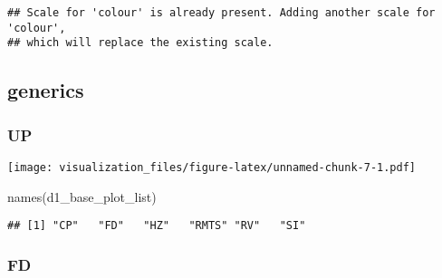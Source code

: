 \documentclass[
]{article}
\newenvironment{Shaded}{\begin{snugshade}}{\end{snugshade}}
\newcommand{\AttributeTok}[1]{\textcolor[rgb]{0.77,0.63,0.00}{#1}}
\newcommand{\FunctionTok}[1]{\textcolor[rgb]{0.00,0.00,0.00}{#1}}
\newcommand{\NormalTok}[1]{#1}
\newcommand{\OtherTok}[1]{\textcolor[rgb]{0.56,0.35,0.01}{#1}}
\newcommand{\SpecialCharTok}[1]{\textcolor[rgb]{0.00,0.00,0.00}{#1}}
\newcommand{\StringTok}[1]{\textcolor[rgb]{0.31,0.60,0.02}{#1}}
\begin{document}
\begin{verbatim}
## Scale for 'colour' is already present. Adding another scale for 'colour',
## which will replace the existing scale.
\end{verbatim}

\hypertarget{generics}{%
\subsection{generics}\label{generics}}

\hypertarget{up}{%
\subsubsection{UP}\label{up}}

\begin{Shaded}
\end{Shaded}

\texttt{[image: visualization\_files/figure-latex/unnamed-chunk-7-1.pdf]}

\begin{Shaded}
\begin{Highlighting}[]
\FunctionTok{names}\NormalTok{(d1\_base\_plot\_list)}
\end{Highlighting}
\end{Shaded}

\begin{verbatim}
## [1] "CP"   "FD"   "HZ"   "RMTS" "RV"   "SI"
\end{verbatim}

\hypertarget{fd}{%
\subsubsection{FD}\label{fd}}

\begin{Shaded}
\end{Shaded}
\end{document}
